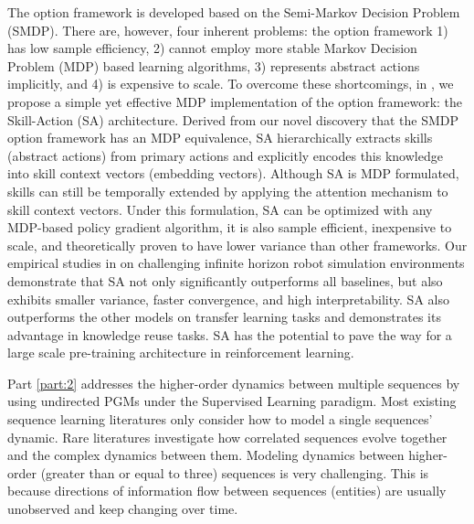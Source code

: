 The option framework is developed based on the Semi-Markov
Decision Problem (SMDP). There are, however, four inherent
problems: the option framework 1) has low sample efficiency, 2)
cannot employ more stable Markov Decision Problem (MDP) based
learning algorithms, 3) represents abstract actions implicitly,
and 4) is expensive to scale. To overcome these shortcomings, in
, we propose a simple yet effective MDP
implementation of the option framework: the Skill-Action (SA)
architecture. Derived from our novel discovery that the SMDP
option framework has an MDP equivalence, SA hierarchically
extracts skills (abstract actions) from primary actions and
explicitly encodes this knowledge into skill context vectors
(embedding vectors). Although SA is MDP formulated, skills can
still be temporally extended by applying the attention mechanism
to skill context vectors. Under this formulation, SA can be
optimized with any MDP-based policy gradient algorithm, it is
also sample efficient, inexpensive to scale, and theoretically
proven to have lower variance than other frameworks. Our
empirical studies in  on challenging infinite
horizon robot simulation environments demonstrate that SA not
only significantly outperforms all baselines, but also exhibits
smaller variance, faster convergence, and high interpretability.
SA also outperforms the other models on transfer learning tasks
and demonstrates its advantage in knowledge reuse tasks. SA has
the potential to pave the way for a large scale pre-training
architecture in reinforcement learning.

Part \ref{part:2} addresses the higher-order dynamics between
multiple sequences by using undirected PGMs under the Supervised
Learning paradigm. Most existing sequence learning literatures
\cite{sargent1993bounded,jegadeesh1993returns,shiller1980stock,
  carhart1997persistence,lux2007forecasting,lux2008markov,abry2019shuffling}
only consider how to model a single sequences' dynamic. Rare
literatures investigate how correlated sequences evolve together
and the complex dynamics between them. Modeling dynamics between
higher-order (greater than or equal to three) sequences is very
challenging. This is because directions of information flow
between sequences (entities) are usually unobserved and keep
changing over time.

